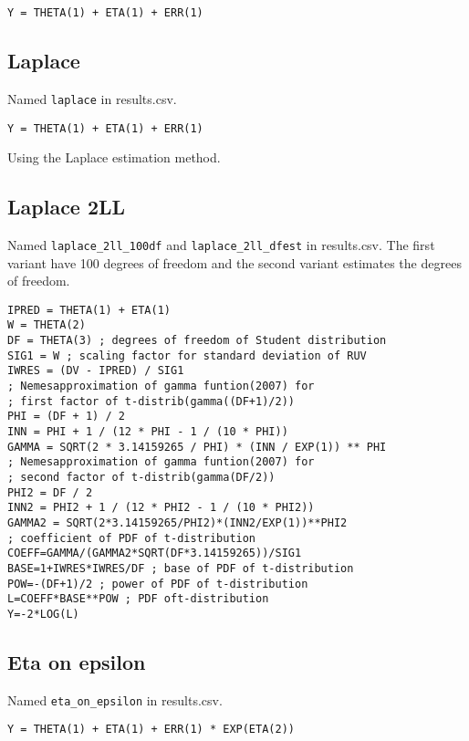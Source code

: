 \begin{verbatim}
Y = THETA(1) + ETA(1) + ERR(1)
\end{verbatim}

\subsection{Laplace}
Named \verb|laplace| in results.csv.

\begin{verbatim}
Y = THETA(1) + ETA(1) + ERR(1)
\end{verbatim}

Using the Laplace estimation method.

\subsection{Laplace 2LL}
Named \verb|laplace_2ll_100df| and \verb|laplace_2ll_dfest| in results.csv. The first variant have 100 degrees of freedom and the second variant estimates the degrees of freedom.

\begin{verbatim}
IPRED = THETA(1) + ETA(1)
W = THETA(2)
DF = THETA(3) ; degrees of freedom of Student distribution
SIG1 = W ; scaling factor for standard deviation of RUV
IWRES = (DV - IPRED) / SIG1
; Nemesapproximation of gamma funtion(2007) for
; first factor of t-distrib(gamma((DF+1)/2))
PHI = (DF + 1) / 2
INN = PHI + 1 / (12 * PHI - 1 / (10 * PHI))
GAMMA = SQRT(2 * 3.14159265 / PHI) * (INN / EXP(1)) ** PHI
; Nemesapproximation of gamma funtion(2007) for
; second factor of t-distrib(gamma(DF/2))
PHI2 = DF / 2
INN2 = PHI2 + 1 / (12 * PHI2 - 1 / (10 * PHI2))
GAMMA2 = SQRT(2*3.14159265/PHI2)*(INN2/EXP(1))**PHI2
; coefficient of PDF of t-distribution
COEFF=GAMMA/(GAMMA2*SQRT(DF*3.14159265))/SIG1
BASE=1+IWRES*IWRES/DF ; base of PDF of t-distribution
POW=-(DF+1)/2 ; power of PDF of t-distribution
L=COEFF*BASE**POW ; PDF oft-distribution
Y=-2*LOG(L)
\end{verbatim}

\subsection{Eta on epsilon}
Named \verb|eta_on_epsilon| in results.csv.

\begin{verbatim}
Y = THETA(1) + ETA(1) + ERR(1) * EXP(ETA(2))
\end{verbatim}


